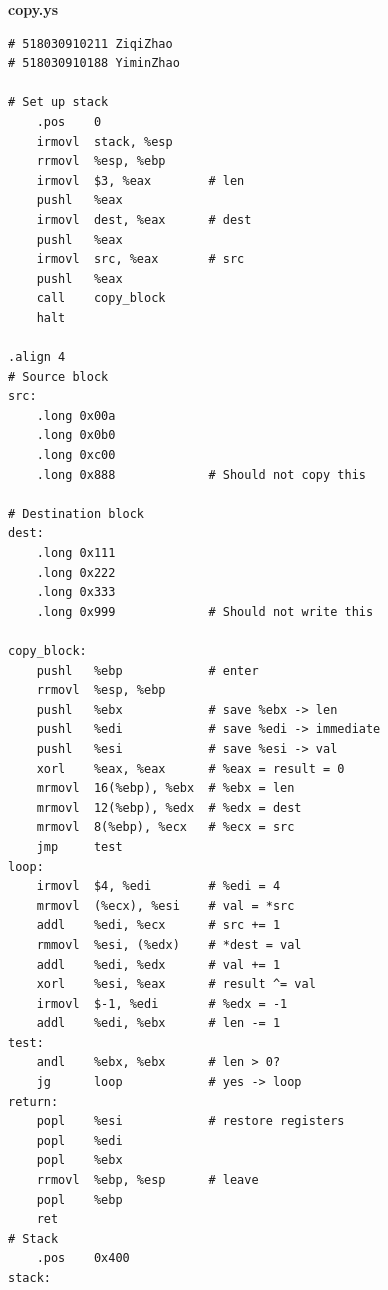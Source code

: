 \documentclass[12pt,a4paper]{article}
\begin{document}
\begin{center}
        \textbf{copy.ys}
\end{center}
\begin{lstlisting}
# 518030910211 ZiqiZhao
# 518030910188 YiminZhao

# Set up stack
    .pos    0
    irmovl  stack, %esp
    rrmovl  %esp, %ebp
    irmovl  $3, %eax        # len
    pushl   %eax
    irmovl  dest, %eax      # dest
    pushl   %eax
    irmovl  src, %eax       # src
    pushl   %eax
    call    copy_block
    halt

.align 4
# Source block
src:
    .long 0x00a
    .long 0x0b0
    .long 0xc00
    .long 0x888             # Should not copy this

# Destination block
dest:
    .long 0x111
    .long 0x222
    .long 0x333
    .long 0x999             # Should not write this

copy_block:
    pushl   %ebp            # enter
    rrmovl  %esp, %ebp
    pushl   %ebx            # save %ebx -> len
    pushl   %edi            # save %edi -> immediate
    pushl   %esi            # save %esi -> val
    xorl    %eax, %eax      # %eax = result = 0
    mrmovl  16(%ebp), %ebx  # %ebx = len
    mrmovl  12(%ebp), %edx  # %edx = dest
    mrmovl  8(%ebp), %ecx   # %ecx = src
    jmp     test
loop:
    irmovl  $4, %edi        # %edi = 4
    mrmovl  (%ecx), %esi    # val = *src
    addl    %edi, %ecx      # src += 1
    rmmovl  %esi, (%edx)    # *dest = val
    addl    %edi, %edx      # val += 1
    xorl    %esi, %eax      # result ^= val
    irmovl  $-1, %edi       # %edx = -1
    addl    %edi, %ebx      # len -= 1
test:
    andl    %ebx, %ebx      # len > 0?
    jg      loop            # yes -> loop
return:
    popl    %esi            # restore registers
    popl    %edi
    popl    %ebx
    rrmovl  %ebp, %esp      # leave
    popl    %ebp
    ret
# Stack 
    .pos    0x400
stack:
\end{lstlisting}
\end{document}

